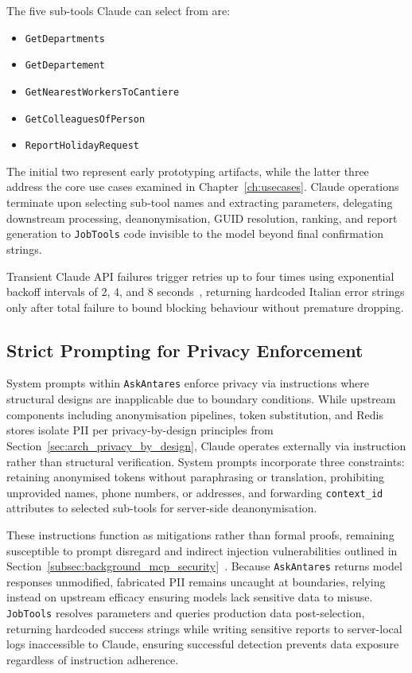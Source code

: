 The five sub-tools Claude can select from are:
\begin{itemize}
\item \texttt{GetDepartments}
\item \texttt{GetDepartement}
\item \texttt{GetNearestWorkersToCantiere}
\item \texttt{GetColleaguesOfPerson}
\item \texttt{ReportHolidayRequest}
\end{itemize}
The initial two represent early prototyping artifacts, while the latter three address the core use cases examined in Chapter~\ref{ch:usecases}. Claude operations terminate upon selecting sub-tool names and extracting parameters, delegating downstream processing, deanonymisation, GUID resolution, ranking, and report generation to \texttt{JobTools} code invisible to the model beyond final confirmation strings.

Transient Claude API failures trigger retries up to four times using exponential backoff intervals of 2, 4, and 8 seconds~\cite{brooker2015backoff}, returning hardcoded Italian error strings only after total failure to bound blocking behaviour without premature dropping.

\subsection{Strict Prompting for Privacy Enforcement}
\label{subsec:impl_prompting}

System prompts within \texttt{AskAntares} enforce privacy via instructions where structural designs are inapplicable due to boundary conditions. While upstream components including anonymisation pipelines, token substitution, and Redis stores isolate PII per privacy-by-design principles from Section~\ref{sec:arch_privacy_by_design}, Claude operates externally via instruction rather than structural verification. System prompts incorporate three constraints: retaining anonymised tokens without paraphrasing or translation, prohibiting unprovided names, phone numbers, or addresses, and forwarding \texttt{context\_id} attributes to selected sub-tools for server-side deanonymisation.

These instructions function as mitigations rather than formal proofs, remaining susceptible to prompt disregard and indirect injection vulnerabilities outlined in Section~\ref{subsec:background_mcp_security}~\cite{greshake2023not}. Because \texttt{AskAntares} returns model responses unmodified, fabricated PII remains uncaught at boundaries, relying instead on upstream efficacy ensuring models lack sensitive data to misuse. \texttt{JobTools} resolves parameters and queries production data post-selection, returning hardcoded success strings while writing sensitive reports to server-local logs inaccessible to Claude, ensuring successful detection prevents data exposure regardless of instruction adherence.

